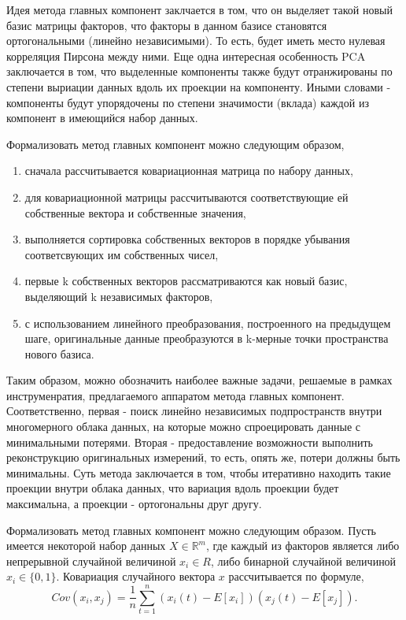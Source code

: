 \documentclass[runningheads]{llncs}
\begin{document}
Идея метода главных компонент заклчается в том, что он выделяет такой новый базис матрицы факторов, что факторы в данном базисе становятся ортогональными (линейно независимыми). То есть, будет иметь место нулевая корреляция Пирсона между ними. Еще одна интересная особенность PCA заключается в том, что выделенные компоненты также будут отранжированы по степени выриации данных вдоль их проекции на компоненту. Иными словами - компоненты будут упорядочены по степени значимости (вклада) каждой из компонент в имеющийся набор данных.

Формализовать метод главных компонент можно следующим образом,
\begin{enumerate}
  \item сначала рассчитывается ковариационная матрица по набору данных,
  \item для ковариационной матрицы рассчитываются соответствующие ей собственные вектора и собственные значения,
  \item выполняется сортировка собственных векторов в порядке убывания соответсвующих им собственных чисел,
  \item первые k собственных векторов рассматриваются как новый базис, выделяющий k независимых факторов,
  \item с использованием линейного преобразования, построенного на предыдущем шаге, оригинальные данные преобразуются в k-мерные точки пространства нового базиса.
\end{enumerate}

Таким образом, можно обозначить наиболее важные задачи, решаемые в рамках инструменратия, предлагаемого аппаратом метода главных компонент. Соответственно, первая - поиск линейно независимых подпространств внутри многомерного облака данных, на которые можно спроецировать данные с минимальными потерями. Вторая - предоставление возможности выполнить реконструкцию оригинальных измерений, то есть, опять же, потери должны быть минимальны. Суть метода заключается в том, чтобы итеративно находить такие проекции внутри облака данных, что вариация вдоль проекции будет максимальна, а проекции - ортогональны друг другу. \par

Формализовать метод главных компонент можно следующим образом. Пусть имеется некоторой набор данных ${X \in \mathbb{R}^m}$, где каждый из факторов является либо непрерывной случайной величиной $x_i \in R$, либо бинарной случайной величиной $x_i \in \{0, 1\}$. Ковариация случайного вектора $x$ рассчитывается по формуле, $$Cov(x_i, x_j) = \frac{1}{n} \sum_{t=1}^n (x_i(t) - E[x_i])(x_j(t) - E[x_j]).$$ \par 
\end{document}
